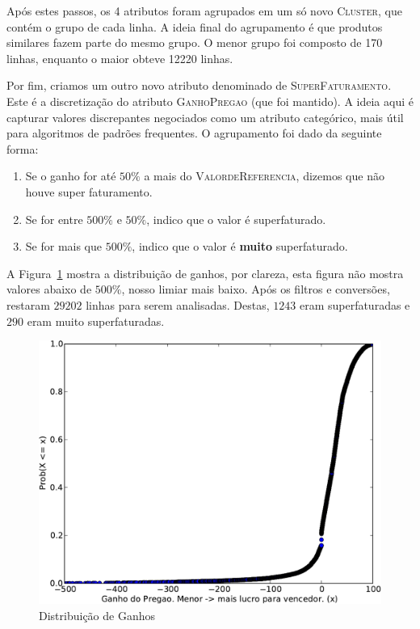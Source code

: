\documentclass[brazil,a4paper,12pt]{article}
\begin{document}
Após estes passos, os 4 atributos foram agrupados em um só novo \textsc{Cluster}, que contém o grupo de cada linha. A ideia final do agrupamento é que produtos similares fazem parte do mesmo grupo. O menor grupo foi composto de 170 linhas, enquanto o maior obteve 12220 linhas.

Por fim, criamos um outro novo atributo denominado de \textsc{SuperFaturamento}. Este é a discretização do atributo \textsc{GanhoPregao} (que foi mantido). A ideia aqui é capturar valores discrepantes negociados como um atributo categórico, mais útil para algoritmos de padrões frequentes. O agrupamento foi dado da seguinte forma:

\begin{enumerate}

\item Se o ganho for até $50\%$ a mais do \textsc{ValordeReferencia}, dizemos que não houve super faturamento.

\item Se for entre $500\%$ e $50\%$, indico que o valor é superfaturado.

\item Se for mais que $500\%$, indico que o valor é \textbf{muito} superfaturado.

\end{enumerate}

A Figura~\ref{fig:super} mostra a distribuição de ganhos, por clareza, esta figura não mostra valores abaixo de $500\%$, nosso limiar mais baixo. Após os filtros e conversões, restaram $29202$ linhas para serem analisadas. Destas, $1243$ eram superfaturadas e $290$ eram muito superfaturadas. 

\begin{figure}
\centering
\includegraphics[scale=0.7]{ganho-crop.pdf}
\caption{Distribuição de Ganhos}
\label{fig:super}
\end{figure}
\end{document}

